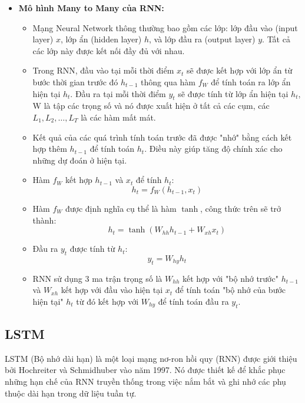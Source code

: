 \documentclass[conference]{IEEEtran}
\begin{document}
\begin{itemize}  
    \item \textbf{Mô hình Many to Many của RNN:}
    \begin{itemize}
        \item Mạng Neural Network thông thường bao gồm các lớp: lớp đầu vào (input layer) \( x \), lớp ẩn (hidden layer) \( h \), và lớp đầu ra (output layer) \( y \). Tất cả các lớp này được kết nối đầy đủ với nhau.
        \item Trong RNN, đầu vào tại mỗi thời điểm \( x_t \) sẽ được kết hợp với lớp ẩn từ bước thời gian trước đó \( h_{t-1} \) thông qua hàm \( f_W \) để tính toán ra lớp ẩn hiện tại \( h_t \). Đầu ra tại mỗi thời điểm \( y_t \) sẽ được tính từ lớp ẩn hiện tại \( h_t \), W là tập các trọng số và nó được xuất hiện ở tất cả các cụm, các \( L_1, L_2, \ldots, L_T \) là các hàm mất mát.
        \item Kết quả của các quá trình tính toán trước đã được "nhớ" bằng cách kết hợp thêm \( h_{t-1} \) để tính toán \( h_t \). Điều này giúp tăng độ chính xác cho những dự đoán ở hiện tại.
        \item Hàm \( f_W \) kết hợp \( h_{t-1} \) và \( x_t \) để tính \( h_t \):
        \[
        h_t = f_W(h_{t-1}, x_t)
        \]
        \item Hàm \( f_W \) được định nghĩa cụ thể là hàm \( \tanh \), công thức trên sẽ trở thành:
        \[
        h_t = \tanh(W_{hh}h_{t-1} + W_{xh}x_t)
        \]
        \item Đầu ra \( y_t \) được tính từ \( h_t \):
        \[
        y_t = W_{hy}h_t
        \]
        \item RNN sử dụng 3 ma trận trọng số là \( W_{hh} \) kết hợp với "bộ nhớ trước" \( h_{t-1} \) và \( W_{xh} \) kết hợp với đầu vào hiện tại \( x_t \) để tính toán "bộ nhớ của bước hiện tại" \( h_t \) từ đó kết hợp với \( W_{hy} \) để tính toán đầu ra \( y_t \).
    \end{itemize}
            
\end{itemize}

\subsection{LSTM}

LSTM (Bộ nhớ dài hạn) là một loại mạng nơ-ron hồi quy (RNN) được giới thiệu bởi Hochreiter và Schmidhuber vào năm 1997. Nó được thiết kế để khắc phục những hạn chế của RNN truyền thống trong việc nắm bắt và ghi nhớ các phụ thuộc dài hạn trong dữ liệu tuần tự.
\end{document}
